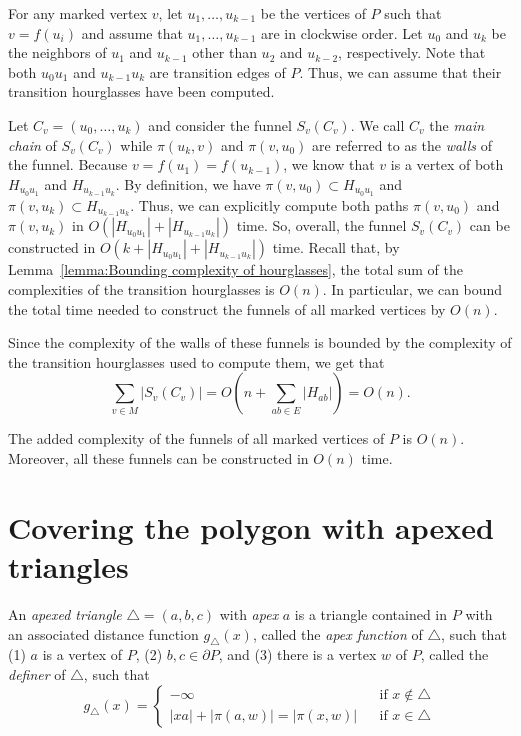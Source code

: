 \documentclass[a4paper,UKenglish]{lipics}
\newcommand{\fn}[2]{\ensuremath{S_{\scriptscriptstyle #1}(#2)}}
\newcommand{\ff}[1]{\ensuremath{f(#1)}}
\newcommand{\g}[2]{\ensuremath{|\pi(#1, #2)|}}
\newcommand{\p}[2]{\ensuremath{\pi(#1, #2)}}
\begin{document}
For any marked vertex $v$, let $u_1, \ldots, u_{k-1}$ be the vertices of $P$ such that $v = \ff{u_i}$ and assume that $u_1, \ldots, u_{k-1}$ are in clockwise order. Let $u_0$ and $u_k$ be the neighbors of $u_1$ and $u_{k-1}$ other than $u_2$ and $u_{k-2}$, respectively. Note that both $u_0 u_1$ and $u_{k-1}u_k$ are transition edges of $P$. Thus, we can assume that their transition hourglasses have been computed.

Let $C_v = (u_0, \ldots, u_k)$ and consider the funnel $\fn{v}{C_v}$.
We call $C_v$ the \emph{main chain} of $\fn{v}{C_v}$ while $\p{u_k}{ v}$ and $\p{v}{ u_0}$ are referred to as the \emph{walls} of the funnel.  
Because $v = \ff{u_1} = \ff{u_{k-1}}$, we know that $v$ is a vertex of both $H_{u_0 u_1}$ and  $H_{u_{k-1}u_k}$. 
By definition, we have $\p{v}{ u_0}\subset H_{u_0u_1}$ and $\p{v}{u_k}\subset H_{u_{k-1}u_k}$. Thus, we can explicitly compute both paths $\p{v}{ u_0}$ and $\p{v}{u_k}$ in $O( |H_{u_0 u_1}| + |H_{u_{k-1}u_k}|)$ time.
So, overall, the funnel $\fn{v}{C_v}$ can be constructed in $O(k + |H_{u_0 u_1}| + |H_{u_{k-1}u_k}|)$ time. 
Recall that, by Lemma~\ref{lemma:Bounding complexity of hourglasses}, the total sum of the complexities of the transition hourglasses is $O(n)$. In particular, we can bound the total time needed to construct the funnels of all marked vertices by $O(n)$. 

Since the complexity of the walls of these funnels is bounded by the complexity of the transition hourglasses used to compute them, we get that $$\sum_{v\in M} |\fn{v}{C_v}|  = O\left(n + \sum_{ab\in E} |H_{ab}|\right) = O(n).$$

\begin{lemma}\label{lemma: Marked vertices funnels construction}
The added complexity of the funnels of all marked vertices of $P$ is $O(n)$. 
Moreover, all these funnels can be constructed in $O(n)$ time.
\end{lemma}


\section{Covering the polygon with apexed triangles}\label{Section:Computing apexed triangles}
An \emph{apexed triangle} $\triangle = (a,b,c)$ with \emph{apex} $a$ is a triangle contained in $P$ with an associated distance function $g_\triangle(x)$, called the \emph{apex function} of $\triangle$, such that (1) $a$ is a vertex of $P$, (2) $b,c \in\partial P$, and (3) there is a  vertex $w$ of  $P$, called the \emph{definer} of $\triangle$, such that
$$g_\triangle(x) = \left\{ \begin{array}{lll}
-\infty&&\text{if $x\notin \triangle$}\\
|xa| + \g{a}{w} = \g{x}{w} && \text{if $x\in \triangle$}
\end{array}\right.$$
\end{document}
